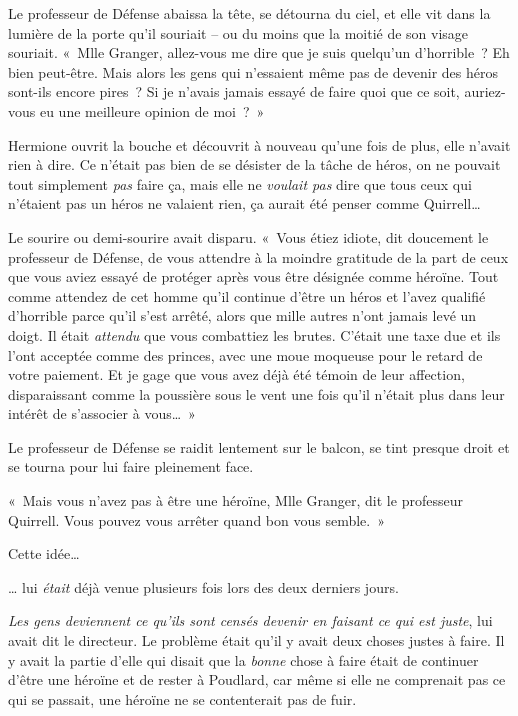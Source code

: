 Le professeur de Défense abaissa la tête, se détourna du ciel, et elle vit dans la lumière de la porte qu'il souriait -- ou du moins que la moitié de son visage souriait. «~Mlle Granger, allez-vous me dire que je suis quelqu'un d'horrible~? Eh bien peut-être. Mais alors les gens qui n'essaient même pas de devenir des héros sont-ils encore pires~? Si je n'avais jamais essayé de faire quoi que ce soit, auriez-vous eu une meilleure opinion de moi~?~»

Hermione ouvrit la bouche et découvrit à nouveau qu'une fois de plus, elle n'avait rien à dire. Ce n'était pas bien de se désister de la tâche de héros, on ne pouvait tout simplement \emph{pas} faire ça, mais elle ne \emph{voulait pas} dire que tous ceux qui n'étaient pas un héros ne valaient rien, ça aurait été penser comme Quirrell…

Le sourire ou demi-sourire avait disparu. «~Vous étiez idiote, dit doucement le professeur de Défense, de vous attendre à la moindre gratitude de la part de ceux que vous aviez essayé de protéger après vous être désignée comme héroïne. Tout comme attendez de cet homme qu'il continue d'être un héros et l'avez qualifié d'horrible parce qu'il s'est arrêté, alors que mille autres n'ont jamais levé un doigt. Il était \emph{attendu} que vous combattiez les brutes. C'était une taxe due et ils l'ont acceptée comme des princes, avec une moue moqueuse pour le retard de votre paiement. Et je gage que vous avez déjà été témoin de leur affection, disparaissant comme la poussière sous le vent une fois qu'il n'était plus dans leur intérêt de s'associer à vous…~»

Le professeur de Défense se raidit lentement sur le balcon, se tint presque droit et se tourna pour lui faire pleinement face.

«~Mais vous n'avez pas à être une héroïne, Mlle Granger, dit le professeur Quirrell. Vous pouvez vous arrêter quand bon vous semble.~»

Cette idée…

… lui \emph{était} déjà venue plusieurs fois lors des deux derniers jours.

\emph{Les gens deviennent ce qu'ils sont censés devenir en faisant ce qui est juste}, lui avait dit le directeur. Le problème était qu'il y avait deux choses justes à faire. Il y avait la partie d'elle qui disait que la \emph{bonne} chose à faire était de continuer d'être une héroïne et de rester à Poudlard, car même si elle ne comprenait pas ce qui se passait, une héroïne ne se contenterait pas de fuir.

